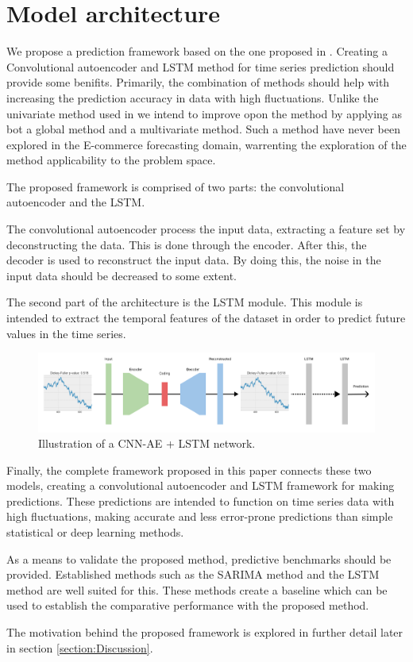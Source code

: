\section{Model architecture}
\label{section:Architecture:Model}

We propose a prediction framework based on the one proposed in \cite{Zhao2019}.
Creating a Convolutional autoencoder and LSTM method for time series prediction should provide some benifits.
Primarily, the combination of methods should help with increasing the prediction accuracy in data with high fluctuations.
Unlike the univariate method used in \cite{Zhao2019} we intend to improve opon the method by applying as bot a global method and a multivariate method.
Such a method have never been explored in the E-commerce forecasting domain, warrenting the exploration of the method applicability to the problem space.

The proposed framework is comprised of two parts: the convolutional autoencoder and the LSTM.

The convolutional autoencoder process the input data, extracting a feature set by deconstructing the data.
This is done through the encoder. After this, the decoder is used to reconstruct the input data.
By doing this, the noise in the input data should be decreased to some extent.

The second part of the architecture is the LSTM module.
This module is intended to extract the temporal features of the dataset
in order to predict future values in the time series.

\begin{figure}[h!]
    \centering
    \includegraphics[width=\textwidth]{./sections/Architecture/figures/CNN-AE + LSTM.png}
    \hfill
    \caption{Illustration of a CNN-AE + LSTM network.}
    \label{fig:stacked_autoencoder_arch}
\end{figure}

Finally, the complete framework proposed in this paper connects these two models,
creating a convolutional autoencoder and LSTM framework for making predictions.
These predictions are intended to function on time series data with high fluctuations,
making accurate and less error-prone predictions than simple statistical or deep learning methods.


As a means to validate the proposed method, predictive benchmarks should be provided.
Established methods such as the SARIMA method and the LSTM method are well suited for this.
These methods create a baseline which can be used to establish the comparative performance with the proposed method.

The motivation behind the proposed framework is explored in further detail later in section \ref{section:Discussion}.

